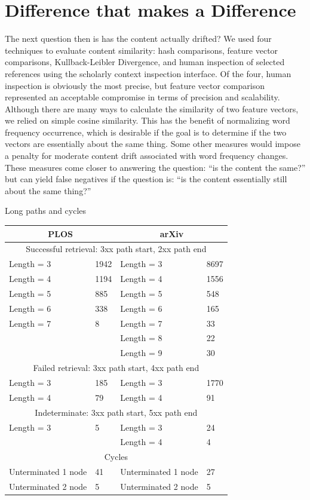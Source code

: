 \documentclass[12pt]{article}
\begin{document}
\section{Difference that makes a Difference}
The next question then is has the content actually drifted? We used four techniques to evaluate content  similarity: hash comparisons, feature vector comparisons, Kullback-Leibler Divergence, and human inspection of selected references using the scholarly context inspection interface. Of the four, human inspection is obviously the most precise, but feature vector comparison represented an acceptable compromise in terms of precision and scalability. Although there are many ways to calculate the similarity of two feature vectors, we relied on simple cosine similarity. This has the benefit of normalizing word frequency occurrence, which is desirable if the goal is to determine if the two vectors are essentially about the same thing. Some other measures would impose a penalty for moderate content drift associated with word frequency changes. These measures come closer to answering the question: “is the content the same?” but can yield false negatives if the question is: “is the content essentially still about the same thing?” 

\begin{center}
  Long paths and cycles
  \begin{tabular}{|p{3cm}|p{3cm}|p{3cm}|p{3cm}|}
  \hline
  \multicolumn{2}{|c|}{PLOS} & \multicolumn{2}{|c|}{arXiv} \\
  \hline
  \multicolumn{4}{|c|}{Successful retrieval: 3xx path start, 2xx path end} \\
  \hline
  Length = 3 & 1942 & Length = 3 & 8697 \\
  \hline
  Length = 4 & 1194 & Length = 4 & 1556 \\
  \hline
  Length = 5 & 885 & Length = 5 & 548 \\
  \hline
  Length = 6 & 338 & Length = 6 & 165 \\
  \hline
  Length = 7 & 8 & Length = 7 & 33 \\
  \hline
  & &  Length = 8 & 22 \\
  \hline
  & &  Length = 9 & 30 \\
  \hline
  \multicolumn{4}{|c|}{Failed retrieval: 3xx path start, 4xx path end} \\
  \hline
  Length = 3 & 185 & Length = 3 & 1770 \\
  \hline
  Length = 4 & 79 & Length = 4 & 91 \\
  \hline
  \multicolumn{4}{|c|}{Indeterminate: 3xx path start, 5xx path end} \\
  \hline
  Length = 3 & 5 & Length = 3 & 24 \\
  \hline
  & &  Length = 4 & 4 \\
  \hline
  \multicolumn{4}{|c|}{Cycles} \\
  \hline
  Unterminated 1 node & 41 & Unterminated 1 node & 27 \\
  \hline
  Unterminated 2 node & 5 & Unterminated 2 node & 5 \\
  \hline
  \end{tabular}
\end{center}
\end{document}
